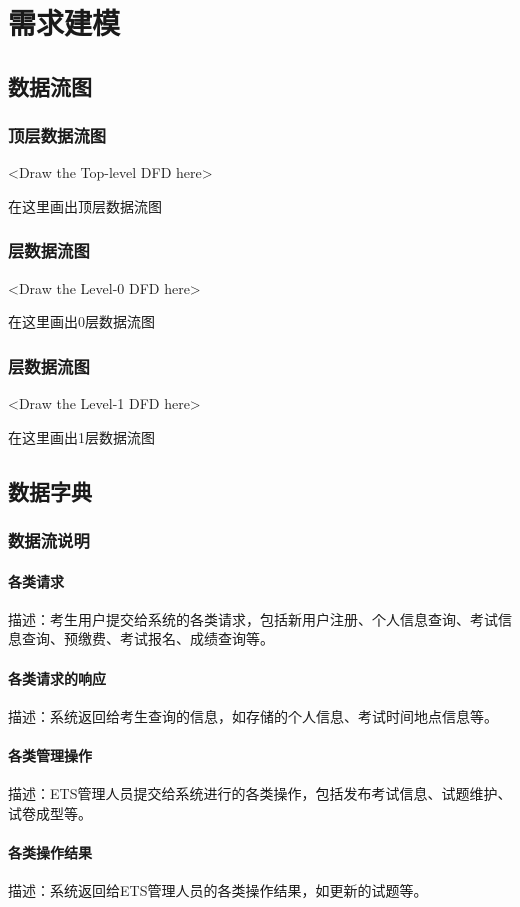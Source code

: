 \chapter{需求建模 }
\section{数据流图}
\subsection{顶层数据流图}
<Draw the Top-level DFD here>

在这里画出顶层数据流图

\subsection{层数据流图}
<Draw the Level-0 DFD here>

在这里画出0层数据流图

\subsection{层数据流图}
<Draw the Level-1 DFD here>

在这里画出1层数据流图

\section{数据字典}
\subsection{数据流说明}
\subsubsection{各类请求}
描述：考生用户提交给系统的各类请求，包括新用户注册、个人信息查询、考试信息查询、预缴费、考试报名、成绩查询等。

\subsubsection{各类请求的响应}
描述：系统返回给考生查询的信息，如存储的个人信息、考试时间地点信息等。

\subsubsection{各类管理操作}
描述：ETS管理人员提交给系统进行的各类操作，包括发布考试信息、试题维护、试卷成型等。
\subsubsection{各类操作结果}
描述：系统返回给ETS管理人员的各类操作结果，如更新的试题等。
